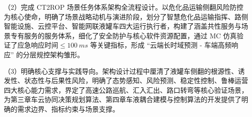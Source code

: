 （2）完成 CT2ROP 场景任务体系架构全流程设计。以危化品运输侧翻风险防控为核心使命，明确了场景战略动机与演进阶段，划分了智慧危化品运输指挥、路侧智能设施、云控平台、智能网联液罐车四大运行执行者，构建了涵盖共性服务与场景专有服务的服务体系，细化了安全防护与核心软件资源配置，通过 MC 仿真验证了应急响应时间$\le \SI{100}{ms}$ 等关键指标，形成 “云端长时域预测 - 车端高频响应” 的分层规控架构雏形。

（3）明确核心支撑与实践导向。架构设计过程中厘清了液罐车侧翻的根源性、诱发性、状态性与后果性风险，明确了态势感知、风险预测、稳定性控制、鲁棒运营四大核心能力需求，界定了高速公路巡航、汇入汇出、路口转弯等核心验证场景，为第三章车云协同决策规划算法、第四章车液耦合建模与控制算法的开发提供了明确的需求边界、指标约束与场景支撑。

